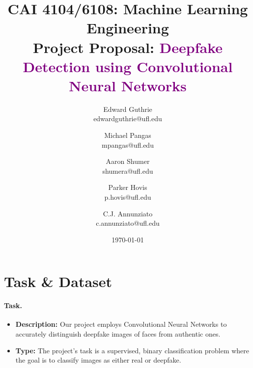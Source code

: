 \documentclass[10pt]{article}
\title{CAI 4104/6108: Machine Learning Engineering\\
	\Large Project Proposal: {\textcolor{purple}{Deepfake Detection using Convolutional Neural Networks}}} %
\author{
        Edward Guthrie \\%
        edwardguthrie@ufl.edu\\
        \and
        Michael Pangas \\
        mpangas@ufl.edu\\
        \and
        Aaron Shumer \\
        shumera@ufl.edu\\
        \and
        Parker Hovis \\
        p.hovis@ufl.edu\\
        \and
        C.J. Annunziato \\
        c.annunziato@ufl.edu\\
}
\date{\today}
\begin{document}

\maketitle




\section*{Task \& Dataset}


\paragraph{Task.} 

\begin{itemize}

\item {\bf Description: } Our project employs Convolutional Neural Networks to accurately distinguish deepfake images of faces from authentic ones.  %

\item {\bf Type: } The project's task is a supervised, binary classification problem where the goal is to classify images as either real or deepfake.%

\end{itemize}
\end{document}
